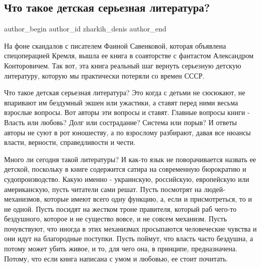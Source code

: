 
 
 
 
 
 
\subsection{Что такое детская серьезная литература?}
\label{sec:08_01_2022.fb.zharkih_denis.1.detskaja_literatura_savenkova}
 
\ifcmt
 author_begin
   author_id zharkih_denis
 author_end
\fi

На фоне скандалов с писателем Фаиной Савенковой, которая объявлена
спецоперацией Кремля, вышла ее книга в соавторстве с фантастом Александром
Конторовичем. Так вот, эта книга реальный шаг вернуть серьезную детскую
литературу, которую мы практически потеряли со времен СССР. 


Что такое детская серьезная литература? Это когда с детьми не сюсюкают, не
впаривают им бездумный экшен или ужастики, а ставят перед ними весьма взрослые
вопросы. Вот авторы эти вопросы и ставят. Главные вопросы книги - Власть или
любовь? Долг или сострадание? Система или порыв? И ответы авторы не суют в рот
юношеству, а по взрослому разбирают, давая все нюансы власти, верности,
справедливости и чести. 

Много ли сегодня такой литературы? И как-то язык не поворачивается назвать ее
детской, поскольку в книге содержится сатира на современную бюрократию и
судопроизводство. Какую именно - украинскую, российскую, европейскую или
американскую, пусть читатели сами решат. Пусть посмотрят на людей-механизмов,
которые имеют всего одну функцию, а, если и присмотреться, то и не одной. Пусть
посидят на жестком троне правителя, который раб чего-то бездушного, которое и
не существо вовсе, и не совсем механизм. Пусть почувствуют, что иногда в этих
механизмах просыпаются человеческие чувства и они идут на благородные поступки.
Пусть поймут, что власть часто бездушна, а потому может убить живое, и то, для
чего она, в принципе, предназначена. Потому, что если книга написана с умом и
любовью, ее стоит почитать.

